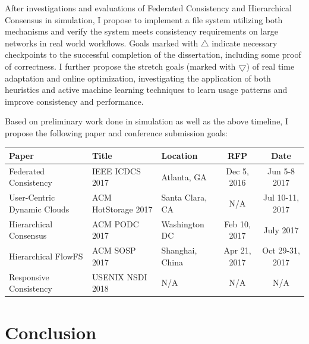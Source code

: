 \documentclass{article}
\begin{document}
After investigations and evaluations of Federated Consistency and Hierarchical Consensus in simulation, I propose to implement a file system utilizing both mechanisms and verify the system meets consistency requirements on large networks in real world workflows. Goals marked with $\bigtriangleup$ indicate necessary checkpoints to the successful completion of the dissertation, including some proof of correctness. I further propose the stretch goals (marked with $\bigtriangledown$) of real time adaptation and online optimization, investigating the application of both heuristics and active machine learning techniques to learn usage patterns and improve consistency and performance.

Based on preliminary work done in simulation as well as the above timeline, I propose the following paper and conference submission goals:

\begin{center}
\begin{tabular}{|l|l|l|c|c|}
\hline
Paper & Title & Location & RFP & Date \\
\hline
Federated Consistency & IEEE ICDCS 2017 & Atlanta, GA & Dec 5, 2016 & Jun 5-8 2017 \\

User-Centric Dynamic Clouds & ACM HotStorage 2017 & Santa Clara, CA & N/A & Jul 10-11, 2017 \\

Hierarchical Consensus & ACM PODC 2017 & Washington DC & Feb 10, 2017 & July 2017 \\

Hierarchical FlowFS & ACM SOSP 2017 & Shanghai, China & Apr 21, 2017 & Oct 29-31, 2017 \\

Responsive Consistency & USENIX NSDI 2018 & N/A & N/A & N/A \\

\hline
\end{tabular}
\end{center}

\section{Conclusion}
\label{sec:conclusion}
\end{document}
